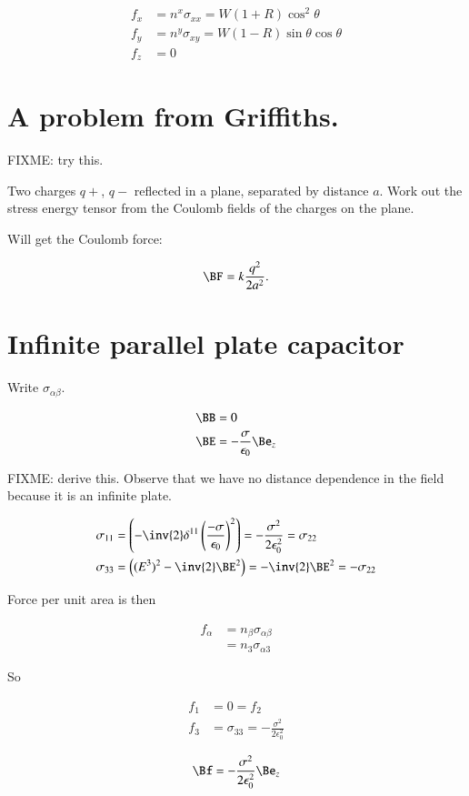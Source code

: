 \begin{align}\label{eqn:relativisticElectrodynamicsT9:310}
f_x &= n^x \sigma_{x x} = W (1 + R) \cos^2\theta \\
f_y &= n^y \sigma_{x y} = W (1 - R) \sin\theta \cos\theta \\
f_z &= 0
\end{align}

\section{A problem from Griffiths.}

FIXME: try this.

Two charges $q+$, $q-$ reflected in a plane, separated by distance $a$.  Work out the stress energy tensor from the Coulomb fields of the charges on the plane.

Will get the Coulomb force:

\begin{equation}\label{eqn:relativisticElectrodynamicsT9:330}
\BF = k \frac{q^2}{2 a^2}.
\end{equation}

\section{Infinite parallel plate capacitor}

Write $\sigma_{\alpha\beta}$.

\begin{align}\label{eqn:relativisticElectrodynamicsT9:350}
\BB &= 0  \\
\BE &= - \frac{\sigma}{\epsilon_0} \Be_z
\end{align}

FIXME: derive this.  Observe that we have no distance dependence in the field because it is an infinite plate.

\begin{align}\label{eqn:relativisticElectrodynamicsT9:370}
\sigma_{1 1} &= \left( - \inv{2} \delta^{1 1} \left( \frac{-\sigma}{\epsilon_0} \right)^2 \right) = - \frac{ \sigma^2}{ 2 \epsilon_0^2 } = \sigma_{22} \\
\sigma_{3 3} &= \left( (E^3)^2 - \inv{2} \BE^2 \right)  = - \inv{2} \BE^2 = - \sigma_{2 2}
\end{align}

Force per unit area is then

\begin{align*}
f_\alpha 
&= n_\beta \sigma_{\alpha \beta} \\
&= n_3 \sigma_{\alpha 3}
\end{align*}

So 

\begin{align}\label{eqn:relativisticElectrodynamicsT9:390}
f_1 &= 0 = f_2 \\
f_3 &= \sigma_{3 3} = -\frac{\sigma^2}{2 \epsilon_0^2}
\end{align}

\begin{equation}\label{eqn:relativisticElectrodynamicsT9:410}
\Bf = -\frac{\sigma^2}{2 \epsilon_0^2} \Be_z
\end{equation}

\EndArticle
